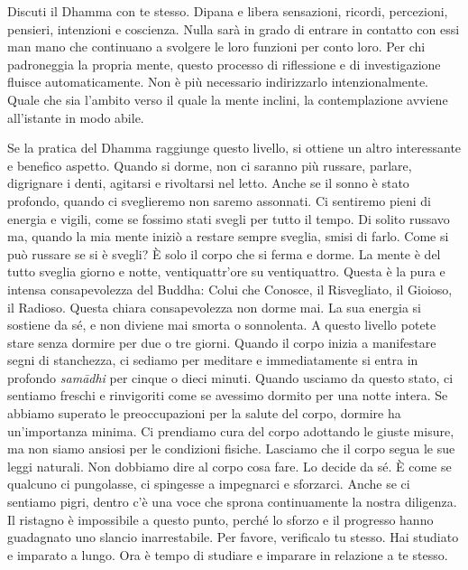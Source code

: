 Discuti il Dhamma con te stesso. Dipana e libera sensazioni, ricordi,
percezioni, pensieri, intenzioni e coscienza. Nulla sarà in grado di
entrare in contatto con essi man mano che continuano a svolgere le loro
funzioni per conto loro. Per chi padroneggia la propria mente, questo
processo di riflessione e di investigazione fluisce automaticamente. Non
è più necessario indirizzarlo intenzionalmente. Quale che sia l'ambito
verso il quale la mente inclini, la contemplazione avviene all'istante
in modo abile.

Se la pratica del Dhamma raggiunge questo livello, si ottiene un altro
interessante e benefico aspetto. Quando si dorme, non ci saranno più
russare, parlare, digrignare i denti, agitarsi e rivoltarsi nel letto.
Anche se il sonno è stato profondo, quando ci sveglieremo non saremo
assonnati. Ci sentiremo pieni di energia e vigili, come se fossimo stati
svegli per tutto il tempo. Di solito russavo ma, quando la mia mente
iniziò a restare sempre sveglia, smisi di farlo. Come si può russare se
si è svegli? È solo il corpo che si ferma e dorme. La mente è del tutto
sveglia giorno e notte, ventiquattr'ore su ventiquattro. Questa è la
pura e intensa consapevolezza del Buddha: Colui che Conosce, il
Risvegliato, il Gioioso, il Radioso. Questa chiara consapevolezza non
dorme mai. La sua energia si sostiene da sé, e non diviene mai smorta o
sonnolenta. A questo livello potete stare senza dormire per due o tre
giorni. Quando il corpo inizia a manifestare segni di stanchezza, ci
sediamo per meditare e immediatamente si entra in profondo
\emph{samādhi} per cinque o dieci minuti. Quando usciamo da questo
stato, ci sentiamo freschi e rinvigoriti come se avessimo dormito per
una notte intera. Se abbiamo superato le preoccupazioni per la salute
del corpo, dormire ha un'importanza minima. Ci prendiamo cura del corpo
adottando le giuste misure, ma non siamo ansiosi per le condizioni
fisiche. Lasciamo che il corpo segua le sue leggi naturali. Non dobbiamo
dire al corpo cosa fare. Lo decide da sé. È come se qualcuno ci
pungolasse, ci spingesse a impegnarci e sforzarci. Anche se ci sentiamo
pigri, dentro c'è una voce che sprona continuamente la nostra diligenza.
Il ristagno è impossibile a questo punto, perché lo sforzo e il
progresso hanno guadagnato uno slancio inarrestabile. Per favore,
verificalo tu stesso. Hai studiato e imparato a lungo. Ora è tempo di
studiare e imparare in relazione a te stesso.

